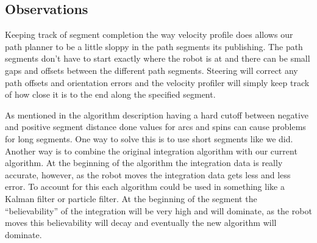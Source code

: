\subsection{Observations}

Keeping track of segment completion the way velocity profile does allows our path planner to be a little sloppy in the path segments its publishing. The path segments don't have to start exactly where the robot is at and there can be small gaps and offsets between the different path segments. Steering will correct any path offsets and orientation errors and the velocity profiler will simply keep track of how close it is to the end along the specified segment.

As mentioned in the algorithm description having a hard cutoff between negative and positive segment distance done values for arcs and spins can cause problems for long segments. One way to solve this is to use short segments like we did. Another way is to combine the original integration algorithm with our current algorithm. At the beginning of the algorithm the integration data is really accurate, however, as the robot moves the integration data gets less and less error. To account for this each algorithm could be used in something like a Kalman filter or particle filter. At the beginning of the segment the ``believability'' of the integration will be very high and will dominate, as the robot moves this believability will decay and eventually the new algorithm will dominate.